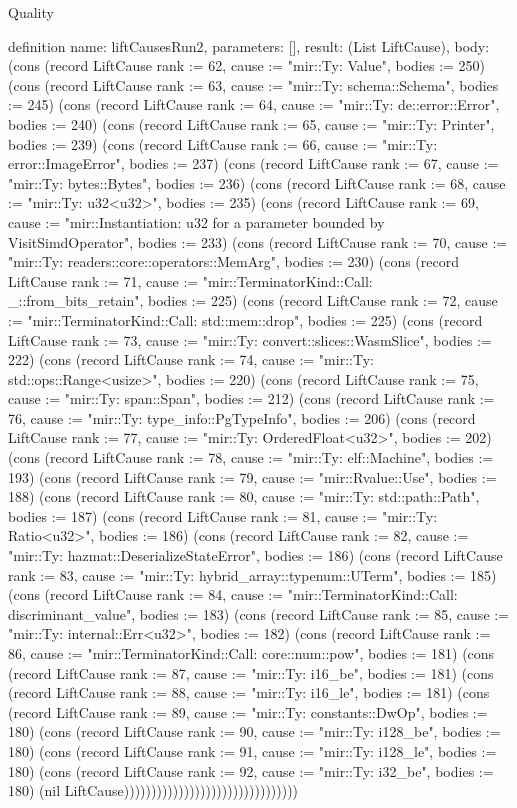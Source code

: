 \begin{lexlean}{Quality}
\begin{semanticmodule}
definition{
  name: liftCausesRun2,
  parameters: [],
  result: (List LiftCause),
  body: (cons (record LiftCause {rank := 62, cause := "mir::Ty: Value", bodies := 250}) (cons (record LiftCause {rank := 63, cause := "mir::Ty: schema::Schema", bodies := 245}) (cons (record LiftCause {rank := 64, cause := "mir::Ty: de::error::Error", bodies := 240}) (cons (record LiftCause {rank := 65, cause := "mir::Ty: Printer", bodies := 239}) (cons (record LiftCause {rank := 66, cause := "mir::Ty: error::ImageError", bodies := 237}) (cons (record LiftCause {rank := 67, cause := "mir::Ty: bytes::Bytes", bodies := 236}) (cons (record LiftCause {rank := 68, cause := "mir::Ty: u32<u32>", bodies := 235}) (cons (record LiftCause {rank := 69, cause := "mir::Instantiation: u32 for a parameter bounded by VisitSimdOperator", bodies := 233}) (cons (record LiftCause {rank := 70, cause := "mir::Ty: readers::core::operators::MemArg", bodies := 230}) (cons (record LiftCause {rank := 71, cause := "mir::TerminatorKind::Call: _::from_bits_retain", bodies := 225}) (cons (record LiftCause {rank := 72, cause := "mir::TerminatorKind::Call: std::mem::drop", bodies := 225}) (cons (record LiftCause {rank := 73, cause := "mir::Ty: convert::slices::WasmSlice", bodies := 222}) (cons (record LiftCause {rank := 74, cause := "mir::Ty: std::ops::Range<usize>", bodies := 220}) (cons (record LiftCause {rank := 75, cause := "mir::Ty: span::Span", bodies := 212}) (cons (record LiftCause {rank := 76, cause := "mir::Ty: type_info::PgTypeInfo", bodies := 206}) (cons (record LiftCause {rank := 77, cause := "mir::Ty: OrderedFloat<u32>", bodies := 202}) (cons (record LiftCause {rank := 78, cause := "mir::Ty: elf::Machine", bodies := 193}) (cons (record LiftCause {rank := 79, cause := "mir::Rvalue::Use", bodies := 188}) (cons (record LiftCause {rank := 80, cause := "mir::Ty: std::path::Path", bodies := 187}) (cons (record LiftCause {rank := 81, cause := "mir::Ty: Ratio<u32>", bodies := 186}) (cons (record LiftCause {rank := 82, cause := "mir::Ty: hazmat::DeserializeStateError", bodies := 186}) (cons (record LiftCause {rank := 83, cause := "mir::Ty: hybrid_array::typenum::UTerm", bodies := 185}) (cons (record LiftCause {rank := 84, cause := "mir::TerminatorKind::Call: discriminant_value", bodies := 183}) (cons (record LiftCause {rank := 85, cause := "mir::Ty: internal::Err<u32>", bodies := 182}) (cons (record LiftCause {rank := 86, cause := "mir::TerminatorKind::Call: core::num::pow", bodies := 181}) (cons (record LiftCause {rank := 87, cause := "mir::Ty: i16_be", bodies := 181}) (cons (record LiftCause {rank := 88, cause := "mir::Ty: i16_le", bodies := 181}) (cons (record LiftCause {rank := 89, cause := "mir::Ty: constants::DwOp", bodies := 180}) (cons (record LiftCause {rank := 90, cause := "mir::Ty: i128_be", bodies := 180}) (cons (record LiftCause {rank := 91, cause := "mir::Ty: i128_le", bodies := 180}) (cons (record LiftCause {rank := 92, cause := "mir::Ty: i32_be", bodies := 180}) (nil LiftCause))))))))))))))))))))))))))))))))
}


\end{semanticmodule}
\end{lexlean}
